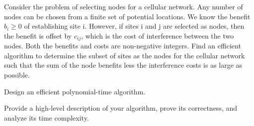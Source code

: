 \newpage
{} %

\problemdes

Consider the problem of selecting nodes for a cellular network. Any number of nodes can be chosen from a finite set of potential locations. We know the benefit $b_i \geq 0$ of establishing site i. However, if sites i and j are selected as nodes, then the benefit is offset by $c_{ij}$, which is the cost of interference between the two nodes. Both the benefits and costs are non-negative integers. Find an efficient algorithm to determine the subset of sites as the nodes for the cellular network such that the sum of the node benefits less the interference costs is as large as possible.

Design an efficient polynomial-time algorithm.

Provide a high-level description of your algorithm, prove its correctness, and analyze its time complexity.

\solution










